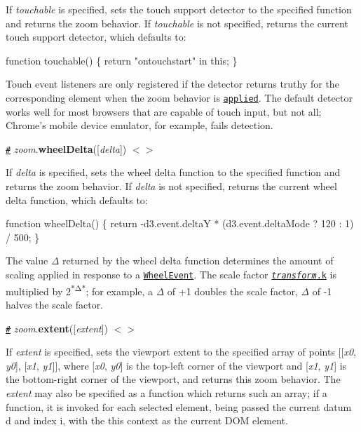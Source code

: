 If {\itshape touchable} is specified, sets the touch support detector to the specified function and returns the zoom behavior. If {\itshape touchable} is not specified, returns the current touch support detector, which defaults to\+:


\begin{DoxyCode}
function touchable() \{
  return "ontouchstart" in this;
\}
\end{DoxyCode}


Touch event listeners are only registered if the detector returns truthy for the corresponding element when the zoom behavior is \href{#_zoom}{\tt applied}. The default detector works well for most browsers that are capable of touch input, but not all; Chrome’s mobile device emulator, for example, fails detection.

\href{#zoom_wheelDelta}{\tt \#} {\itshape zoom}.{\bfseries wheel\+Delta}(\mbox{[}{\itshape delta}\mbox{]}) \href{https://github.com/d3/d3-zoom/blob/master/src/zoom.js#L382}{\tt $<$$>$}

If {\itshape delta} is specified, sets the wheel delta function to the specified function and returns the zoom behavior. If {\itshape delta} is not specified, returns the current wheel delta function, which defaults to\+:


\begin{DoxyCode}
function wheelDelta() \{
  return -d3.event.deltaY * (d3.event.deltaMode ? 120 : 1) / 500;
\}
\end{DoxyCode}


The value {\itshape Δ} returned by the wheel delta function determines the amount of scaling applied in response to a \href{https://developer.mozilla.org/en-US/docs/Web/API/WheelEvent}{\tt Wheel\+Event}. The scale factor \href{#zoomTransform}{\tt {\itshape transform}.k} is multiplied by 2\textsuperscript{$\ast$Δ$\ast$}; for example, a {\itshape Δ} of +1 doubles the scale factor, {\itshape Δ} of -\/1 halves the scale factor.

\href{#zoom_extent}{\tt \#} {\itshape zoom}.{\bfseries extent}(\mbox{[}{\itshape extent}\mbox{]}) \href{https://github.com/d3/d3-zoom/blob/master/src/zoom.js#L394}{\tt $<$$>$}

If {\itshape extent} is specified, sets the viewport extent to the specified array of points \mbox{[}\mbox{[}{\itshape x0}, {\itshape y0}\mbox{]}, \mbox{[}{\itshape x1}, {\itshape y1}\mbox{]}\mbox{]}, where \mbox{[}{\itshape x0}, {\itshape y0}\mbox{]} is the top-\/left corner of the viewport and \mbox{[}{\itshape x1}, {\itshape y1}\mbox{]} is the bottom-\/right corner of the viewport, and returns this zoom behavior. The {\itshape extent} may also be specified as a function which returns such an array; if a function, it is invoked for each selected element, being passed the current datum {\ttfamily d} and index {\ttfamily i}, with the {\ttfamily this} context as the current D\+OM element.


